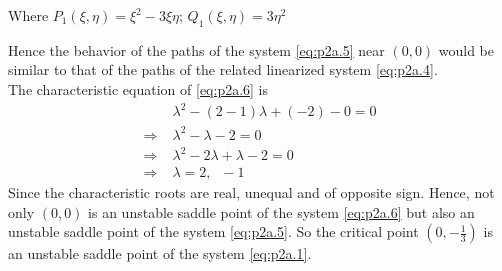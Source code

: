 \documentclass[../main-sheet.tex]{subfiles}
\begin{document}
\begin{soln}[a]
\begin{enumerate}[label=(\roman*)]
        Where \(P_1(\xi,\eta)=\xi^2-3\xi\eta\); \(Q_1(\xi,\eta)=3\eta^2\)
    \end{enumerate}
    Hence the behavior of the paths of the system \eqref{eq:p2a.5} near \((0,0)\) would be similar to that of the paths of the related linearized system \eqref{eq:p2a.4}.\\
    The characteristic equation of \eqref{eq:p2a.6} is
    \begin{align*}
        &\lambda^2-(2-1)\lambda+(-2)-0=0\\
        \Rightarrow\;&\lambda^2-\lambda-2=0\\
        \Rightarrow\;&\lambda^2-2\lambda+\lambda-2=0\\
        \Rightarrow\;&\lambda=2,\;\;-1
    \end{align*}
    Since the characteristic roots are real, unequal and of opposite sign. Hence, not only \((0,0)\) is an unstable saddle point of the system \eqref{eq:p2a.6} but also an unstable saddle point of the system \eqref{eq:p2a.5}. So the critical
    point \((0,-\frac{1}{3})\) is an unstable saddle point of the system \eqref{eq:p2a.1}.\\
    

\end{soln}
\end{document}
